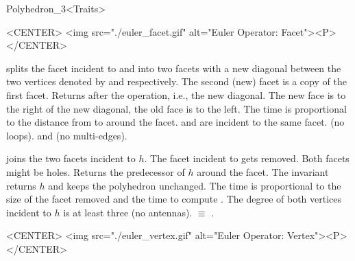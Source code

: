 \begin{ccRefClass}{Polyhedron_3<Traits>}
\begin{ccHtmlOnly}
    <CENTER>
    <img src="./euler_facet.gif" alt="Euler Operator: Facet"><P>
    </CENTER>
\end{ccHtmlOnly}


    {splits the facet incident to  and  into two facets
     with a new diagonal between the two vertices denoted by  and
      respectively. The second (new) facet is a copy of the
     first facet. Returns  after the
     operation, i.e., the new diagonal. The new face is to the right of the 
     new diagonal, the old face is to the left. The time is
     proportional to the distance from  to  around the facet.
    \ccPrecond {} and  are incident to the same facet.
                (no loops).  and
                (no multi-edges).}

    {joins the two facets incident to $h$. The facet incident to
       gets removed. Both facets might be
    holes. Returns the predecessor of $h$ around the facet. The invariant
     returns $h$ and keeps
    the polyhedron unchanged. The time is proportional to the size of the
    facet removed and the time to compute .
    \ccPrecond The degree of both vertices incident to $h$ is at least
    three (no antennas).
      $\equiv$ 
    .}

\begin{ccHtmlOnly}
    <CENTER>
    <img src="./euler_vertex.gif" alt="Euler Operator: Vertex"><P>
    </CENTER>
\end{ccHtmlOnly}


\end{ccRefClass}
